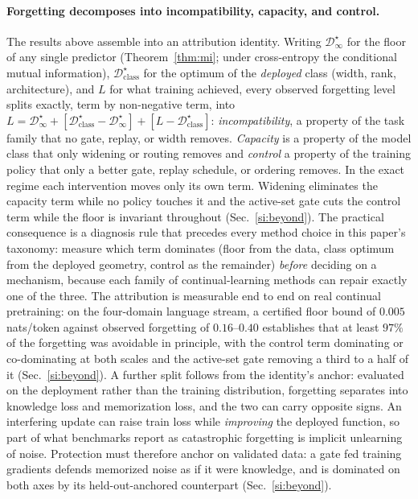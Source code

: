 \documentclass[10pt,a4paper]{article}
\theoremstyle{plain}
\theoremstyle{definition}
\begin{document}
\paragraph{Forgetting decomposes into incompatibility, capacity, and control.} The
results above assemble into an attribution identity. Writing $\mathcal{D}^\star_\infty$
for the floor of any single predictor (Theorem~\ref{thm:mi}; under cross-entropy the
conditional mutual information), $\mathcal{D}^\star_{\mathrm{class}}$ for the optimum of
the \emph{deployed} class (width, rank, architecture), and $L$ for what training
achieved, every observed forgetting level splits exactly, term by non-negative term,
into $L=\mathcal{D}^\star_\infty+[\mathcal{D}^\star_{\mathrm{class}}-\mathcal{D}^\star_\infty]
+[L-\mathcal{D}^\star_{\mathrm{class}}]$: \emph{incompatibility}, a property of the task
family that no gate, replay, or width removes. \emph{Capacity} is a property of the model
class that only widening or routing removes and \emph{control} a property of the
training policy that only a better gate, replay schedule, or ordering removes. In the
exact regime each intervention moves only its own term. Widening eliminates the
capacity term while no policy touches it and the active-set gate cuts the control term
while the floor is invariant throughout (Sec.~\ref{si:beyond}). The practical
consequence is a diagnosis rule that precedes every method choice in this paper's
taxonomy: measure which term dominates (floor from the data, class optimum from the
deployed geometry, control as the remainder) \emph{before} deciding on a mechanism, because each
family of continual-learning methods can repair exactly one of the three. The
attribution is measurable end to end on real continual pretraining: on the four-domain
language stream, a certified floor bound of $0.005$ nats/token against observed
forgetting of $0.16$--$0.40$ establishes that at least $97\%$ of the forgetting was
avoidable in principle, with the control term dominating or co-dominating at both
scales and the active-set gate removing a third to a half of it
(Sec.~\ref{si:beyond}). A further
split follows from the identity's anchor: evaluated on the deployment rather than the
training distribution, forgetting separates into knowledge loss and memorization loss,
and the two can carry opposite signs. An interfering update can raise train loss while
\emph{improving} the deployed function, so part of what benchmarks report as
catastrophic forgetting is implicit unlearning of noise. Protection must therefore
anchor on validated data: a gate fed training gradients defends memorized noise as if
it were knowledge, and is dominated on both axes by its held-out-anchored counterpart
(Sec.~\ref{si:beyond}).
\end{document}
